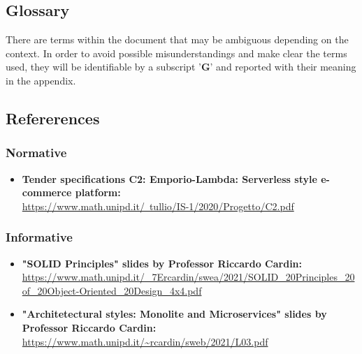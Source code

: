 \subsection{Glossary}
There are terms within the document that may be ambiguous depending on the context. In order to avoid possible misunderstandings
and make clear the terms used, they will be identifiable by a subscript '\textbf{G}' and reported with their meaning in the appendix.
\subsection{Refererences}
\subsubsection{Normative}
\begin{itemize}
    \item \textbf{Tender specifications C2: Emporio-Lambda: Serverless style e-commerce platform:} \\ \href{https://www.math.unipd.it/~tullio/IS-1/2020/Progetto/C2.pdf}{https://www.math.unipd.it/~tullio/IS-1/2020/Progetto/C2.pdf}
\end{itemize}
\subsubsection{Informative}
\begin{itemize}
    \item \textbf{"SOLID Principles" slides by Professor Riccardo Cardin:} \\
          \url{
              https://www.math.unipd.it/_7Ercardin/swea/2021/SOLID_20Principles_20of_20Object-Oriented_20Design_4x4.pdf}
    \item \textbf{"Architetectural styles: Monolite and Microservices" slides by Professor Riccardo Cardin:} \\
          \url{https://www.math.unipd.it/~rcardin/sweb/2021/L03.pdf}
\end{itemize}